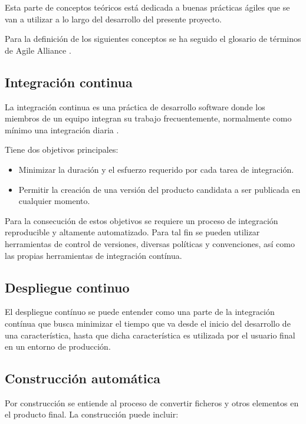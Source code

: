 Esta parte de conceptos teóricos está dedicada a buenas prácticas ágiles que se van a utilizar a lo largo del desarrollo del presente proyecto.

Para la definición de los siguientes conceptos se ha seguido el glosario de términos de Agile Alliance \cite{agilealliance:glossary}.

\subsection{Integración continua}

La integración continua es una práctica de desarrollo software donde los miembros de un equipo integran su trabajo frecuentemente, normalmente como mínimo una integración diaria \cite{fowler2006continuous}.

Tiene dos objetivos principales:

\begin{itemize}
	\item Minimizar la duración y el esfuerzo requerido por cada tarea de integración.
	\item Permitir la creación de una versión del producto candidata a ser publicada en cualquier momento.
\end{itemize}

Para la consecución de estos objetivos se requiere un proceso de integración reproducible y altamente automatizado. Para tal fin se pueden utilizar herramientas de control de versiones, diversas políticas y convenciones, así como las propias herramientas de integración contínua.

\subsection{Despliegue continuo}

El despliegue contínuo se puede entender como una parte de la integración contínua que busca minimizar el tiempo que va desde el inicio del desarrollo de una característica, hasta que dicha característica es utilizada por el usuario final en un entorno de producción.

\subsection{Construcción automática}

Por construcción se entiende al proceso de convertir ficheros y otros elementos en el producto final. La construcción puede incluir:

